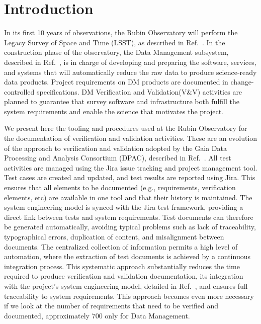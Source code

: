 \section{Introduction}

In its first 10 years of observations, the Rubin Observatory will perform the Legacy Survey of Space and Time (LSST), as described
in Ref.~. In the construction phase of the observatory, the Data Management subsystem,
described in Ref.~, is in charge of developing and preparing the
software, services, and systems that will automatically reduce the raw data to produce science-ready data products.
Project requirements on DM products are documented in change-controlled specifications. DM Verification and Validation(V\&V)
activities are planned to guarantee that survey software and infrastructure both fulfill the system requirements
and enable the science that motivates the project.

We present here the tooling and procedures used at the Rubin Observatory for the documentation of verification and validation activities.
These are an evolution of the approach to verification and validation adopted by the Gaia Data Processing and Analysis Consortium (DPAC), described in Ref.~.
All test activities are managed using the Jira  issue tracking and project management tool. 
Test cases are created and updated, and test results are reported using Jira. 
This ensures that all elements to be documented (e.g., requirements, verification elements, etc) 
are available in one tool and that their history is maintained.
The system engineering model is synced with the Jira test framework, providing a direct link between
tests and system requirements. Test documents can therefore be generated automatically, avoiding typical problems
such as lack of traceability, typographical errors, duplication of content, and misalignment between documents. The
centralized collection of information permits a high level of automation, where the extraction of test documents is
achieved by a continuous integration process. This systematic approach substantially reduces the time required to
produce verification and validation documentation, its integration with the project's system engineering model,
detailed in Ref.~, and ensures full traceability to system requirements. 
This approach becomes even more necessary if we look at the number of requirements that need to be verified and documented, 
approximately 700 only for Data Management.

